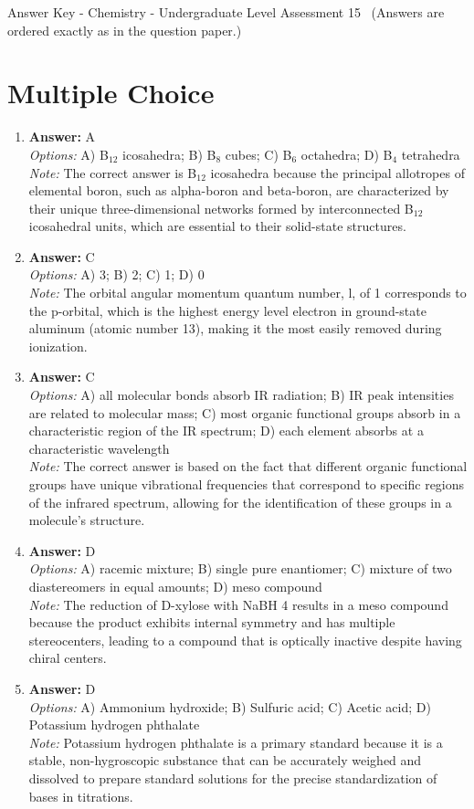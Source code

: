 \documentclass[12pt]{article}
\begin{document}
\begin{center}
Answer Key - Chemistry - Undergraduate Level Assessment 15 \
\small (Answers are ordered exactly as in the question paper.)
\end{center}

\section*{Multiple Choice}
\begin{enumerate}[label=\arabic*.]
\item \textbf{Answer:} A
\\ \textit{Options:} A) B$_{12}$ icosahedra; B) B$_{8}$ cubes; C) B$_{6}$ octahedra; D) B$_{4}$ tetrahedra
\\ \textit{Note:} The correct answer is B$_{12}$ icosahedra because the principal allotropes of elemental boron, such as alpha-boron and beta-boron, are characterized by their unique three-dimensional networks formed by interconnected B$_{12}$ icosahedral units, which are essential to their solid-state structures.
\item \textbf{Answer:} C
\\ \textit{Options:} A) 3; B) 2; C) 1; D) 0
\\ \textit{Note:} The orbital angular momentum quantum number, l, of 1 corresponds to the p-orbital, which is the highest energy level electron in ground-state aluminum (atomic number 13), making it the most easily removed during ionization.
\item \textbf{Answer:} C
\\ \textit{Options:} A) all molecular bonds absorb IR radiation; B) IR peak intensities are related to molecular mass; C) most organic functional groups absorb in a characteristic region of the IR spectrum; D) each element absorbs at a characteristic wavelength
\\ \textit{Note:} The correct answer is based on the fact that different organic functional groups have unique vibrational frequencies that correspond to specific regions of the infrared spectrum, allowing for the identification of these groups in a molecule's structure.
\item \textbf{Answer:} D
\\ \textit{Options:} A) racemic mixture; B) single pure enantiomer; C) mixture of two diastereomers in equal amounts; D) meso compound
\\ \textit{Note:} The reduction of D-xylose with NaBH 4 results in a meso compound because the product exhibits internal symmetry and has multiple stereocenters, leading to a compound that is optically inactive despite having chiral centers.
\item \textbf{Answer:} D
\\ \textit{Options:} A) Ammonium hydroxide; B) Sulfuric acid; C) Acetic acid; D) Potassium hydrogen phthalate
\\ \textit{Note:} Potassium hydrogen phthalate is a primary standard because it is a stable, non-hygroscopic substance that can be accurately weighed and dissolved to prepare standard solutions for the precise standardization of bases in titrations.
\end{enumerate}
\end{document}
